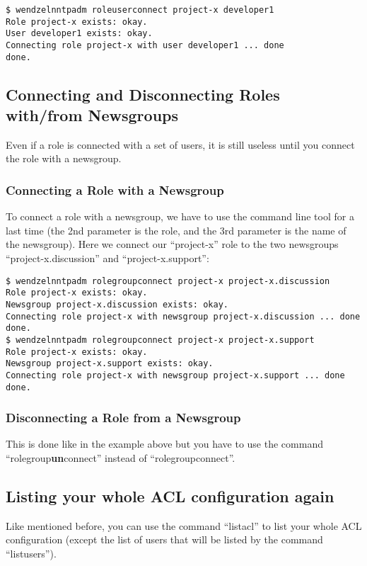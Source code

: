 \begin{verbatim}
$ wendzelnntpadm roleuserconnect project-x developer1
Role project-x exists: okay.
User developer1 exists: okay.
Connecting role project-x with user developer1 ... done
done.
\end{verbatim}

\subsection{Connecting and Disconnecting Roles with/from Newsgroups}

Even if a role is connected with a set of users, it is still useless until you connect the role with a newsgroup.

\subsubsection{Connecting a Role with a Newsgroup}

To connect a role with a newsgroup, we have to use the command line tool for a last time (the 2nd parameter is the role, and the 3rd parameter is the name of the newsgroup). Here we connect our ``project-x'' role to the two newsgroups ``project-x.discussion'' and ``project-x.support'':

\begin{verbatim}
$ wendzelnntpadm rolegroupconnect project-x project-x.discussion
Role project-x exists: okay.
Newsgroup project-x.discussion exists: okay.
Connecting role project-x with newsgroup project-x.discussion ... done
done.
$ wendzelnntpadm rolegroupconnect project-x project-x.support
Role project-x exists: okay.
Newsgroup project-x.support exists: okay.
Connecting role project-x with newsgroup project-x.support ... done
done.
\end{verbatim}

\subsubsection{Disconnecting a Role from a Newsgroup}

This is done like in the example above but you have to use the command ``rolegroup{\bf un}connect'' instead of ``rolegroupconnect''.

\subsection{Listing your whole ACL configuration again}

Like mentioned before, you can use the command ``listacl'' to list your whole ACL configuration (except the list of users that will be listed by the command ``listusers'').

